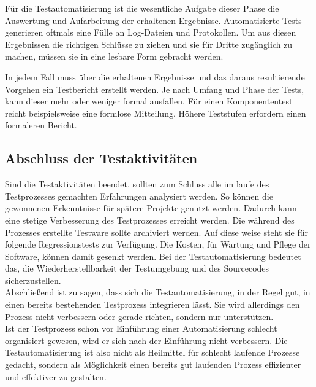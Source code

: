 Für die Testautomatisierung ist die wesentliche Aufgabe dieser Phase die Auswertung und Aufarbeitung der erhaltenen Ergebnisse. Automatisierte Tests generieren oftmals eine Fülle an Log-Dateien und Protokollen. Um aus diesen Ergebnissen die richtigen Schlüsse zu ziehen und sie für Dritte zugänglich zu machen, müssen sie in eine lesbare Form gebracht werden.

In jedem Fall muss über die erhaltenen Ergebnisse und das daraus resultierende Vorgehen ein Testbericht erstellt werden. Je nach Umfang und Phase der Tests, kann dieser mehr oder weniger formal ausfallen. Für einen Komponententest reicht beispielsweise eine formlose Mitteilung. Höhere Teststufen erfordern einen formaleren Bericht.



\subsection{Abschluss der Testaktivitäten}
\label{subsec:abschluss_der_testaktivitäten}
Sind die Testaktivitäten beendet, sollten zum Schluss alle im laufe des Testprozesses gemachten Erfahrungen analysiert werden. So können die gewonnenen Erkenntnisse für spätere Projekte genutzt werden. Dadurch kann eine stetige Verbesserung des Testprozesses erreicht werden.
Die während des Prozesses erstellte Testware sollte archiviert werden. Auf diese weise steht sie für folgende Regressionstests zur Verfügung. Die Kosten, für Wartung und Pflege der Software, können damit gesenkt werden.
Bei der Testautomatisierung bedeutet das, die Wiederherstellbarkeit der Testumgebung und des Sourcecodes sicherzustellen.
\newline\\
Abschließend ist zu sagen, dass sich die Testautomatisierung, in der Regel gut, in einen bereits bestehenden Testprozess integrieren lässt. Sie wird allerdings \glqq den Prozess nicht verbessern oder gerade richten, sondern nur unterstützen.\grqq\ \cite[S.21]{seidl_basiswissen_2012} \\ Ist der Testprozess schon vor Einführung einer Automatisierung schlecht organisiert gewesen, wird er sich nach der Einführung nicht verbessern.
Die Testautomatisierung ist also nicht als Heilmittel für schlecht laufende Prozesse gedacht, sondern als Möglichkeit einen bereits gut laufenden Prozess effizienter und effektiver zu gestalten.

